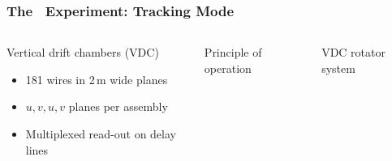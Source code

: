 \begin{frame}
 \frametitle{The \Qweak\ Experiment: Tracking Mode}
 \begin{columns}[T]
   \begin{block}{Vertical drift chambers (VDC)}
    \begin{itemize}
     \item 181 wires in 2\,m wide planes
     \item $u,v,u,v$ planes per assembly
     \item Multiplexed read-out on delay lines
    \end{itemize}
    \centerline{}
   \end{block}
   \begin{block}{Principle of operation}
    \begin{center}
    \end{center}
   \end{block}
   \begin{block}{VDC rotator system}
    \begin{center}
    \end{center}
   \end{block}
 \end{columns}
\end{frame}
